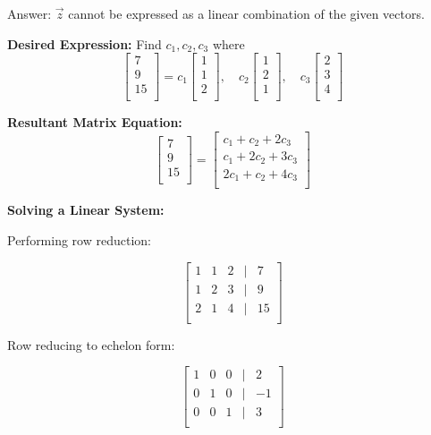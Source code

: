 \documentclass{article}
\begin{document}
Answer: \(\vec{z}\) cannot be expressed as a linear combination of the given vectors.

\textbf{Desired Expression:} Find \(c_1, c_2, c_3\) where
\[
\begin{bmatrix}
    7 \\
    9 \\
    15 \\
\end{bmatrix}
=
c_1
\begin{bmatrix}
    1 \\
    1 \\
    2 \\
\end{bmatrix},
\quad
c_2
\begin{bmatrix}
    1 \\
    2 \\
    1 \\
\end{bmatrix},
\quad
c_3
\begin{bmatrix}
    2 \\
    3 \\
    4 \\
\end{bmatrix}
\]

\textbf{Resultant Matrix Equation:}
\[
\begin{bmatrix}
    7 \\
    9 \\
    15 \\
\end{bmatrix}
=
\begin{bmatrix}
    c_1 + c_2 + 2c_3 \\
    c_1 + 2c_2 + 3c_3 \\
    2c_1 + c_2 + 4c_3 \\
\end{bmatrix}
\]

\textbf{Solving a Linear System:}

Performing row reduction:

\[
\begin{bmatrix}
    1 & 1 & 2 & | & 7 \\
    1 & 2 & 3 & | & 9 \\
    2 & 1 & 4 & | & 15 \\
\end{bmatrix}
\]

Row reducing to echelon form:

\[
\begin{bmatrix}
    1 & 0 & 0 & | & 2 \\
    0 & 1 & 0 & | & -1 \\
    0 & 0 & 1 & | & 3 \\
\end{bmatrix}
\]
\end{document}
